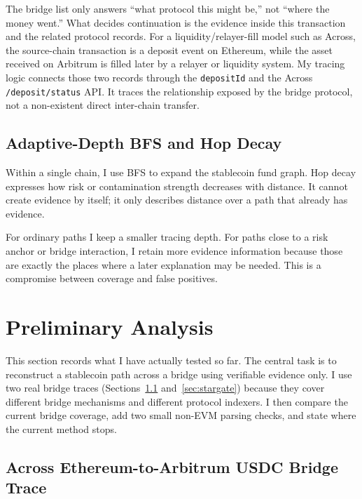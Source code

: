 \documentclass[12pt,a4paper]{article}
\begin{document}
The bridge list only answers ``what protocol this might be,'' not ``where the money went.'' What decides continuation is the evidence inside this transaction and the related protocol records. For a liquidity/relayer-fill model such as Across, the source-chain transaction is a deposit event on Ethereum, while the asset received on Arbitrum is filled later by a relayer or liquidity system. My tracing logic connects those two records through the \texttt{depositId} and the Across \texttt{/deposit/status} API. It traces the relationship exposed by the bridge protocol, not a non-existent direct inter-chain transfer.

\subsection{Adaptive-Depth BFS and Hop Decay}

Within a single chain, I use BFS to expand the stablecoin fund graph. Hop decay expresses how risk or contamination strength decreases with distance. It cannot create evidence by itself; it only describes distance over a path that already has evidence.

For ordinary paths I keep a smaller tracing depth. For paths close to a risk anchor or bridge interaction, I retain more evidence information because those are exactly the places where a later explanation may be needed. This is a compromise between coverage and false positives.

\section{Preliminary Analysis}

This section records what I have actually tested so far. The central task is to reconstruct a stablecoin path across a bridge using verifiable evidence only. I use two real bridge traces (Sections~\ref{sec:across} and~\ref{sec:stargate}) because they cover different bridge mechanisms and different protocol indexers. I then compare the current bridge coverage, add two small non-EVM parsing checks, and state where the current method stops.

\subsection{Across Ethereum-to-Arbitrum USDC Bridge Trace}
\label{sec:across}
\end{document}
